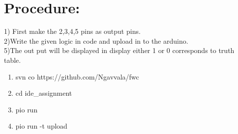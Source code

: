 \documentclass[letterpaper, 10 pt, conference]{ieeeconf}
\begin{document}
\section{Procedure:}
1) First make the 2,3,4,5 pins as output pins.
\\ 2)Write the given logic in code and upload in to the arduino.
\\ 5)The out put will be displayed in display either 1 or 0 corresponds to truth table.
\vspace{5mm} %

\begin{enumerate}
\item svn co https://github.com/Ngavvala/fwc
\item cd ide\_assignment
\item pio run
\item pio run \--t upload

\end{enumerate}



\addtolength{\textheight}{-12cm}   %
\end{document}
